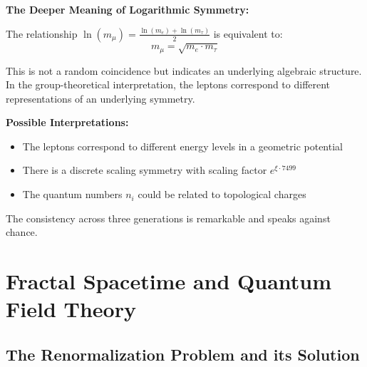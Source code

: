 \documentclass[12pt,a4paper]{article}
\newcommand{\xipar}{\xi}
\begin{document}
	\begin{treatise}
		\textbf{The Deeper Meaning of Logarithmic Symmetry:}
		
		The relationship $\ln(m_\mu) = \frac{\ln(m_e) + \ln(m_\tau)}{2}$ is equivalent to:
		\begin{equation}
			m_\mu = \sqrt{m_e \cdot m_\tau}
		\end{equation}
		
		This is not a random coincidence but indicates an underlying algebraic structure. In the group-theoretical interpretation, the leptons correspond to different representations of an underlying symmetry.
		
		\textbf{Possible Interpretations:}
		\begin{itemize}
			\item The leptons correspond to different energy levels in a geometric potential
			\item There is a discrete scaling symmetry with scaling factor $e^{\xipar \cdot 7499}$
			\item The quantum numbers $n_i$ could be related to topological charges
		\end{itemize}
		
		The consistency across three generations is remarkable and speaks against chance.
	\end{treatise}
	
	\section{Fractal Spacetime and Quantum Field Theory}
	
	\subsection{The Renormalization Problem and its Solution}
	
\end{document}
